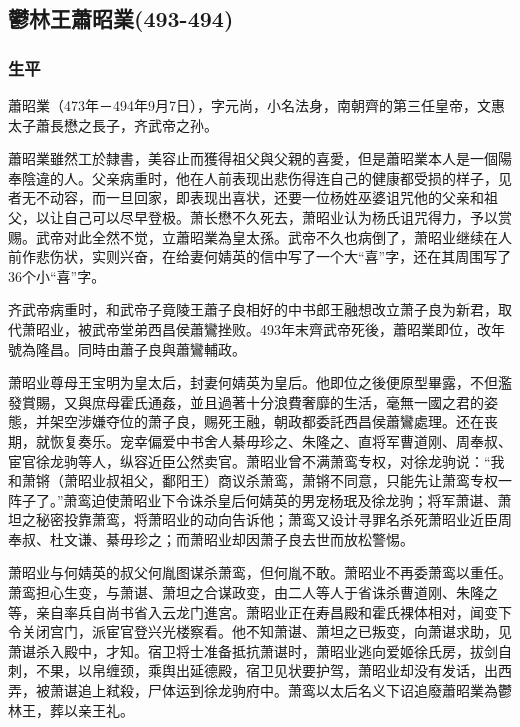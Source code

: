 
\subsection{鬱林王蕭昭業\tiny(493-494)}

\subsubsection{生平}

蕭昭業（473年－494年9月7日），字元尚，小名法身，南朝齊的第三任皇帝，文惠太子蕭長懋之長子，齐武帝之孙。

蕭昭業雖然工於隸書，美容止而獲得祖父與父親的喜愛，但是蕭昭業本人是一個陽奉陰違的人。父亲病重时，他在人前表现出悲伤得连自己的健康都受损的样子，见者无不动容，而一旦回家，即表现出喜状，还要一位杨姓巫婆诅咒他的父亲和祖父，以让自己可以尽早登极。萧长懋不久死去，萧昭业认为杨氏诅咒得力，予以赏赐。武帝对此全然不觉，立蕭昭業為皇太孫。武帝不久也病倒了，萧昭业继续在人前作悲伤状，实则兴奋，在给妻何婧英的信中写了一个大“喜”字，还在其周围写了36个小“喜”字。

齐武帝病重时，和武帝子竟陵王蕭子良相好的中书郎王融想改立萧子良为新君，取代萧昭业，被武帝堂弟西昌侯蕭鸞挫败。493年末齊武帝死後，蕭昭業即位，改年號為隆昌。同時由蕭子良與蕭鸞輔政。

萧昭业尊母王宝明为皇太后，封妻何婧英为皇后。他即位之後便原型畢露，不但濫發賞賜，又與庶母霍氏通姦，並且過著十分浪費奢靡的生活，毫無一國之君的姿態，并架空涉嫌夺位的萧子良，赐死王融，朝政都委託西昌侯蕭鸞處理。还在丧期，就恢复奏乐。宠幸偏爱中书舍人綦毋珍之、朱隆之、直将军曹道刚、周奉叔、宦官徐龙驹等人，纵容近臣公然卖官。萧昭业曾不满萧鸾专权，对徐龙驹说：“我和萧锵（萧昭业叔祖父，鄱阳王）商议杀萧鸾，萧锵不同意，只能先让萧鸾专权一阵子了。”萧鸾迫使萧昭业下令诛杀皇后何婧英的男宠杨珉及徐龙驹；将军萧谌、萧坦之秘密投靠萧鸾，将萧昭业的动向告诉他；萧鸾又设计寻罪名杀死萧昭业近臣周奉叔、杜文谦、綦毋珍之；而萧昭业却因萧子良去世而放松警惕。

萧昭业与何婧英的叔父何胤图谋杀萧鸾，但何胤不敢。萧昭业不再委萧鸾以重任。萧鸾担心生变，与萧谌、萧坦之合谋政变，由二人等人于省诛杀曹道刚、朱隆之等，亲自率兵自尚书省入云龙门進宮。萧昭业正在寿昌殿和霍氏裸体相对，闻变下令关闭宫门，派宦官登兴光楼察看。他不知萧谌、萧坦之已叛变，向萧谌求助，见萧谌杀入殿中，才知。宿卫将士准备抵抗萧谌时，萧昭业逃向爱姬徐氏房，拔剑自刺，不果，以帛缠颈，乘舆出延德殿，宿卫见状要护驾，萧昭业却没有发话，出西弄，被萧谌追上弒殺，尸体运到徐龙驹府中。萧鸾以太后名义下诏追廢蕭昭業為鬱林王，葬以亲王礼。

